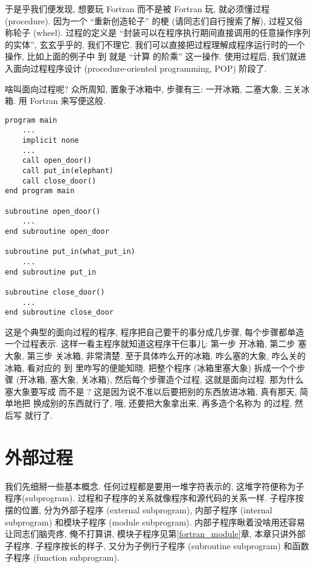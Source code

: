 于是乎我们便发现, 想要玩 Fortran 而不是被 Fortran 玩, 就必须懂过程 (procedure). 因为一个 ``重新创造轮子'' 的梗 (请同志们自行搜索了解), 过程又俗称轮子 (wheel). 过程的定义是 ``封装可以在程序执行期间直接调用的任意操作序列的实体'', 玄玄乎乎的, 我们不理它. 我们可以直接把过程理解成程序运行时的一个操作, 比如上面的例子中  到  就是 ``计算  的阶乘'' 这一操作. 使用过程后, 我们就进入面向过程程序设计 (procedure-oriented programming, POP) 阶段了.

啥叫面向过程呢? 众所周知, 置象于冰箱中, 步骤有三: 一开冰箱, 二塞大象, 三关冰箱. 用 Fortran 来写便这般. 
\begin{lstlisting} 
program main
    ... 
    implicit none
    ... 
    call open_door()
    call put_in(elephant)
    call close_door()
end program main

subroutine open_door()
    ... 
end subroutine open_door

subroutine put_in(what_put_in)
    ... 
end subroutine put_in

subroutine close_door()
    ... 
end subroutine close_door
\end{lstlisting} 
这是个典型的面向过程的程序, 程序把自己要干的事分成几步骤, 每个步骤都单造一个过程表示. 这样一看主程序就知道这程序干仨事儿: 第一步  开冰箱, 第二步  塞大象, 第三步  关冰箱, 非常清楚. 至于具体咋么开的冰箱, 咋么塞的大象, 咋么关的冰箱, 看对应的  到  里咋写的便能知晓. 把整个程序 (冰箱里塞大象) 拆成一个个步骤 (开冰箱, 塞大象, 关冰箱), 然后每个步骤造个过程, 这就是面向过程. 那为什么塞大象要写成  而不是 ? 这是因为说不准以后要把别的东西放进冰箱, 真有那天, 简单地把  换成别的东西就行了, 哦, 还要把大象拿出来, 再多造个名称为  的过程, 然后写  就行了.

\section{外部过程} 

我们先细掰一些基本概念. 任何过程都是要用一堆字符表示的, 这堆字符便称为子程序(subprogram). 过程和子程序的关系就像程序和源代码的关系一样. 子程序按摆的位置, 分为外部子程序 (external subprogram), 内部子程序 (internal subprogram) 和模块子程序 (module subprogram). 内部子程序瞅着没啥用还容易让同志们脑壳疼, 俺不打算讲, 模块子程序见第\ref{fortran_module}章, 本章只讲外部子程序. 子程序按长的样子, 又分为子例行子程序 (subroutine subprogram) 和函数子程序 (function subprogram). 


